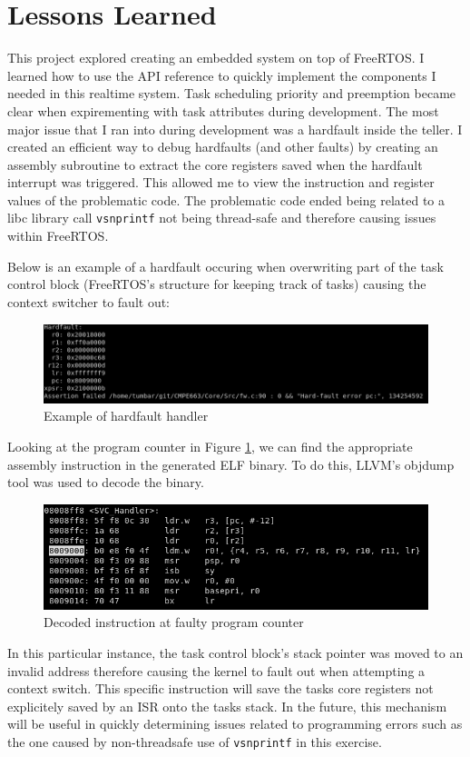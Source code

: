 \documentclass[CMPE]{KGCOEReport}
\def\code#1{\texttt{#1}}
\begin{document}
    \section*{Lessons Learned}

	This project explored creating an embedded system on top of FreeRTOS. I learned
	how to use the API reference to quickly implement the components I needed in this
	realtime system. Task scheduling priority and preemption became clear when
	expirementing with task attributes during development. The most major issue that
	I ran into during development was a hardfault inside the teller. I created an
	efficient way to debug hardfaults (and other faults) by creating an assembly
	subroutine to extract the core registers saved when the hardfault interrupt was
	triggered. This allowed me to view the instruction and register values of the
	problematic code. The problematic code ended being related to a libc library call
	\code{vsnprintf} not being thread-safe and therefore causing issues within FreeRTOS.

	\pagebreak

	Below is an example of a hardfault occuring when overwriting part of the task
	control block (FreeRTOS's structure for keeping track of tasks) causing the
	context switcher to fault out:

	\begin{figure}[h!]
      \centering
      \includegraphics[width=5.5in]{hardfault}
      \caption{Example of hardfault handler}
      \label{fig:fault}
    \end{figure}

	Looking at the program counter in Figure \ref{fig:fault}, we can find the appropriate
	assembly instruction in the generated ELF binary. To do this, LLVM's objdump tool
	was used to decode the binary.

	\begin{figure}[h!]
      \centering
      \includegraphics[width=5.5in]{fault_pc}
      \caption{Decoded instruction at faulty program counter}
      \label{fig:fault_pc}
    \end{figure}

	In this particular instance, the task control block's stack pointer was moved to
	an invalid address therefore causing the kernel to fault out when attempting a
	context switch. This specific instruction will save the tasks core registers not
	explicitely saved by an ISR onto the tasks stack. In the future, this mechanism
	will be useful in quickly determining issues related to programming errors such
	as the one caused by non-threadsafe use of \code{vsnprintf} in this exercise.
\end{document}

